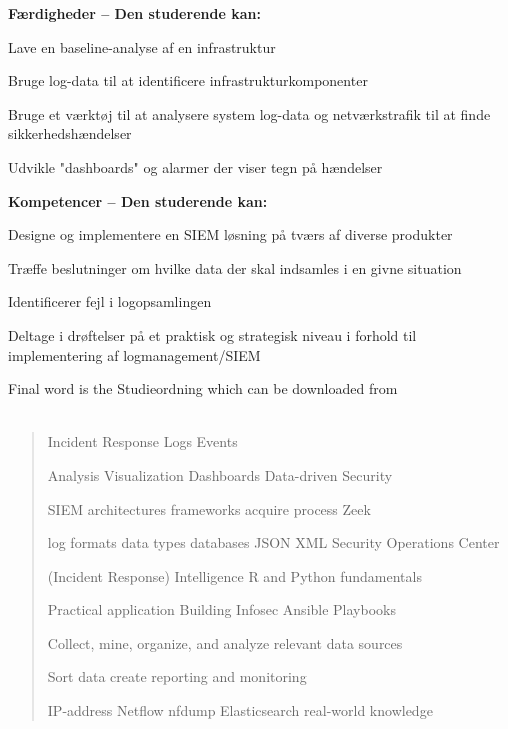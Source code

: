 \documentclass[Screen16to9,17pt]{foils}
\begin{document}
{\bf Færdigheder -- Den studerende kan:}
\begin{list2}
\item Lave en baseline-analyse af en infrastruktur
\item Bruge log-data til at identificere infrastrukturkomponenter
\item Bruge et værktøj til at analysere system log-data og netværkstrafik til at finde sikkerhedshændelser
\item Udvikle "dashboards" og alarmer der viser tegn på hændelser
\end{list2}

{\bf Kompetencer -- Den studerende kan:}
\begin{list2}
\item Designe og implementere en SIEM løsning på tværs af diverse produkter
\item Træffe beslutninger om hvilke data der skal indsamles i en givne situation
\item Identificerer fejl i logopsamlingen
\item Deltage i drøftelser på et praktisk og strategisk niveau i forhold til implementering af
logmanagement/SIEM
\end{list2}

Final word is the Studieordning which can be downloaded from\\
{\footnotesize {}\\
}




\begin{quote}\large
    Incident Response Logs Events

Analysis Visualization Dashboards Data-driven Security

SIEM architectures frameworks acquire process Zeek

log formats data types databases JSON XML Security Operations Center

(Incident Response) Intelligence R and Python fundamentals

Practical application Building Infosec \hskip 1cm Ansible Playbooks

Collect, mine, organize, and analyze relevant data sources

Sort data create reporting and monitoring

IP-address Netflow nfdump Elasticsearch real-world knowledge
\end{quote}
\end{document}
